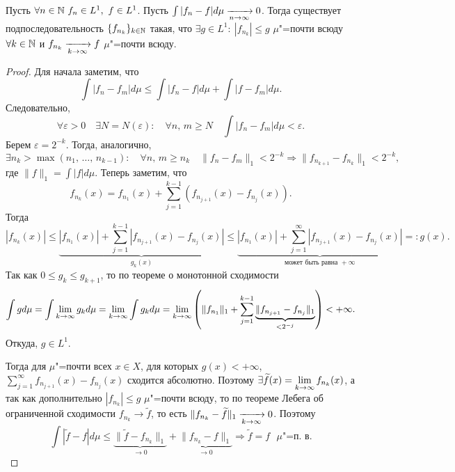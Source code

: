 \begin{theorem}
    Пусть $\forall n\in \mathbb{N}\ f_n\in L^1,\ f\in L^1$.
    Пусть $\int |f_n-f|d\mu\xrightarrow[n\to\infty]{}0$.
    Тогда существует подпоследовательность $\{f_{n_k}\}_{k\in\mathbb{N}}$
    такая, что $\exists g\in L^1:\: |f_{n_k}|\leqslant g$ $\mu$"=почти всюду
    $\forall k\in \mathbb{N}$ и
    $f_{n_k}\xrightarrow[k\to\infty]{}f$ $\mu$"=почти всюду.

    \begin{proof}

        Для начала заметим, что \[
            \int |f_n-f_m|d\mu\leqslant\int|f_n-f|d\mu+\int|f-f_m|d\mu.
        \]
        Следовательно, \[
            \forall\varepsilon>0\quad\exists N=N(\varepsilon):\quad
            \forall n,\, m\geqslant N\quad
            \int |f_n-f_m|d\mu<\varepsilon.
        \]
        Берем $\varepsilon=2^{-k}$. Тогда, аналогично, \[
            \exists n_k>\max(n_1,\,\ldots,\, n_{k-1}):\quad
            \forall n,\, m\geqslant n_k\quad \|f_n-f_m\|_1<2^{-k}\Rightarrow
            \|f_{n_{k+1}}-f_{n_k}\|_1<2^{-k},
        \]
        где $\|f\|_1=\int |f|d\mu$.
        Теперь заметим, что \[
            f_{n_k}(x)=f_{n_1}(x)+\sum_{j=1}^{k-1}\left(f_{n_{j+1}}(x)-f_{n_j}(x)\right).
        \]
        Тогда \[
            |f_{n_k}(x)|\leqslant\underbrace{|f_{n_1}(x)|+\sum_{j=1}^{k-1}\left|f_{n_{j+1}}(x)-f_{n_j}(x)\right|}_{g_k(x)}
            \leqslant\underbrace{|f_{n_1}(x)|+\sum_{j=1}^{\infty}\left|f_{n_{j+1}}(x)-f_{n_j}(x)\right|}
            _{\text{может быть равна } +\infty}=:g(x).
        \]
        Так как $0\leqslant g_k\leqslant g_{k+1}$, то по теореме о монотонной сходимости
        \[
            \int gd\mu=\int \lim_{k\to\infty}g_{k}d\mu=
            \lim_{k\to\infty}\int g_kd\mu=\lim_{k\to\infty}\left(
            \|f_{n_1}\|_1+\sum_{j=1}^{k-1}\underbrace{\|f_{n_{j+1}}-f_{n_j}\|_1}_{<2^{-j}}\right)
            <+\infty.
        \]
        Откуда, $g\in L^1$.

        Тогда для $\mu$"=почти всех $x\in X$, для которых $g(x)<+\infty$,
        $\sum\limits_{j=1}^{\infty}f_{n_{j+1}}(x)-f_{n_j}(x)$ сходится абсолютно.
        Поэтому $\exists \widetilde{f}(x)=\lim\limits_{k\to\infty} f_{n_k}(x)$, а так как
        дополнительно $|f_{n_k}|\leqslant g$ $\mu$"=почти всюду, то по теореме Лебега об
        ограниченной сходимости $f_{n_k}\to\widetilde{f}$, то есть
        $\|f_{n_k}-\widetilde{f}\|_1\xrightarrow[k\to\infty]{}0$.
        Поэтому \[
            \int |\widetilde{f}-f|d\mu\leqslant \underbrace{\|\widetilde{f}-f_{n_k}\|_1}_{\to 0}
            +\underbrace{\|f_{n_k}-f\|_1}_{\to 0}\Rightarrow
            \widetilde{f}=f\text{ $\mu$"=п. в.}
        \]

    \end{proof}
\end{theorem}

